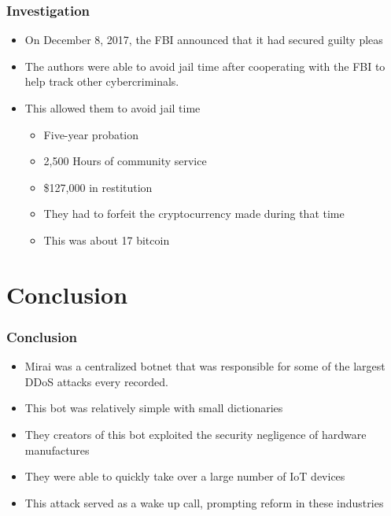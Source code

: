 \documentclass{beamer}
\begin{document}
\begin{frame}
	\frametitle{Investigation}
	\begin{itemize}
		\item On December 8, 2017, the FBI announced that it had secured guilty pleas
		\item The authors were able to avoid jail time after cooperating with the FBI to help track other cybercriminals.
		\item This allowed them to avoid jail time
		\begin{itemize}
			\item Five-year probation
			\item 2,500 Hours of community service
			\item \$127,000 in restitution
			\item They had to forfeit the cryptocurrency made during that time
			\item This was about 17 bitcoin
		\end{itemize}
	\end{itemize}
\end{frame}

\section{Conclusion}

\begin{frame}
	\frametitle{Conclusion}
	\begin{itemize}
		\item Mirai was a centralized botnet that was responsible for some of the largest DDoS attacks every recorded.
		\item This bot was relatively simple with small dictionaries
		\item They creators of this bot exploited the security negligence of hardware manufactures
		\item They were able to quickly take over a large number of IoT devices
		\item This attack served as a wake up call, prompting reform in these industries
	\end{itemize}
\end{frame}
\end{document}
